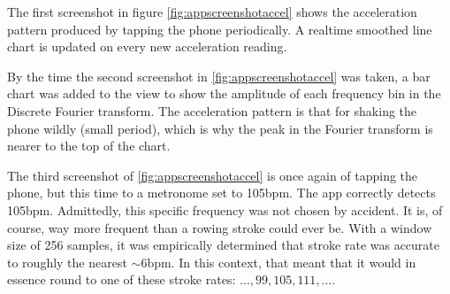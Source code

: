 \documentclass[11pt,twoside,a4paper]{report}
\begin{document}
The first screenshot in figure \ref{fig:appscreenshotaccel} shows the acceleration pattern produced by tapping the phone periodically. A realtime smoothed line chart is updated on every new acceleration reading.

By the time the second screenshot in \ref{fig:appscreenshotaccel} was taken, a bar chart was added to the view to show the amplitude of each frequency bin in the Discrete Fourier transform. The acceleration pattern is that for shaking the phone wildly (small period), which is why the peak in the Fourier transform is nearer to the top of the chart. 

The third screenshot of \ref{fig:appscreenshotaccel} is once again of tapping the phone, but this time to a metronome set to 105bpm. The app correctly detects 105bpm. Admittedly, this specific frequency was not chosen by accident. It is, of course, way more frequent than a rowing stroke could ever be. With a window size of 256 samples, it was empirically determined that stroke rate was accurate to roughly the nearest $\sim6$bpm. In this context, that meant that it would in essence round to one of these stroke rates: $\ldots, 99, 105, 111, \ldots$.
\end{document}
